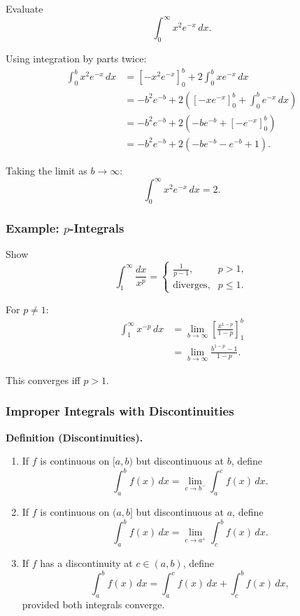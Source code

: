 Evaluate
\[
\int_0^\infty x^2 e^{-x}\,dx.
\]

Using integration by parts twice:
\begin{align}
\int_0^b x^2 e^{-x}\,dx
&= \left[-x^2 e^{-x}\right]_0^b + 2\int_0^b x e^{-x}\,dx \\
&= -b^2 e^{-b} + 2\left(\left[-x e^{-x}\right]_0^b + \int_0^b e^{-x}\,dx\right) \\
&= -b^2 e^{-b} + 2\left(-b e^{-b} + \left[-e^{-x}\right]_0^b\right) \\
&= -b^2 e^{-b} + 2\left(-b e^{-b} - e^{-b} + 1\right).
\end{align}

Taking the limit as $b \to \infty$:
\[
\int_0^\infty x^2 e^{-x}\,dx = 2.
\]

\subsubsection{Example: $p$-Integrals}
\label{sss:exam-6fd6}

Show
\[
\int_1^\infty \frac{dx}{x^p}
=
\begin{cases}
\frac{1}{p-1}, & p > 1, \\
\text{diverges}, & p \le 1.
\end{cases}
\]

For $p \ne 1$:
\begin{align}
\int_1^\infty x^{-p}\,dx
&= \lim_{b\to\infty} \left[\frac{x^{1-p}}{1-p}\right]_1^b \\
&= \lim_{b\to\infty} \frac{b^{1-p} - 1}{1-p}.
\end{align}

This converges iff $p>1$.

\subsubsection{Improper Integrals with Discontinuities}
\label{sss:impr-312b}

\textbf{Definition (Discontinuities).}

\begin{enumerate}
\item If $f$ is continuous on $[a,b)$ but discontinuous at $b$, define
\[
\int_a^b f(x)\,dx = \lim_{c\to b^-} \int_a^c f(x)\,dx.
\]

\item If $f$ is continuous on $(a,b]$ but discontinuous at $a$, define
\[
\int_a^b f(x)\,dx = \lim_{c\to a^+} \int_c^b f(x)\,dx.
\]

\item If $f$ has a discontinuity at $c \in (a,b)$, define
\[
\int_a^b f(x)\,dx
= \int_a^c f(x)\,dx + \int_c^b f(x)\,dx,
\]
provided both integrals converge.
\end{enumerate}

